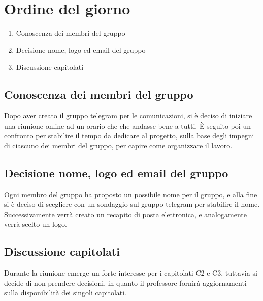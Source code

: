 \section{Ordine del giorno}
\begin{enumerate}
\item Conoscenza dei membri del gruppo
\item Decisione nome, logo ed email del gruppo
\item Discussione capitolati %
\end{enumerate}

\subsection{Conoscenza dei membri del gruppo}
Dopo aver creato il gruppo telegram per le comunicazioni, si è deciso di iniziare una riunione online ad un orario che che andasse bene a tutti. È seguito poi un confronto per stabilire il tempo da dedicare al progetto, sulla base degli impegni di ciascuno dei membri del gruppo, per capire come organizzare il lavoro.
\subsection{Decisione nome, logo ed email del gruppo}
Ogni membro del gruppo ha proposto un possibile nome per il gruppo, e alla fine si è deciso di scegliere con un sondaggio sul gruppo telegram per stabilire il nome. Successivamente verrà creato un recapito di posta elettronica, e analogamente verrà scelto un logo.
\subsection{Discussione capitolati}
Durante la riunione emerge un forte interesse per i capitolati C2 e C3, tuttavia si decide di non prendere decisioni, in quanto il professore fornirà aggiornamenti sulla disponibilità dei singoli capitolati.